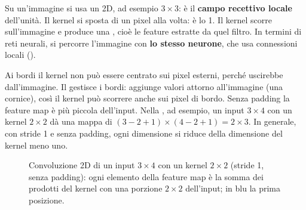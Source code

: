 Su un'immagine si usa un  2D, ad esempio $3\times3$: è il \textbf{campo recettivo locale}
dell'unità. Il kernel si sposta di un pixel alla volta: è lo  1. Il kernel scorre sull'immagine e
produce una , cioè le feature estratte da quel filtro. In termini di reti neurali, si percorre
l'immagine con \textbf{lo stesso neurone}, che usa connessioni locali ().

Ai bordi il kernel non può essere centrato sui pixel esterni, perché uscirebbe dall'immagine. Il
 gestisce i bordi: aggiunge valori attorno all'immagine (una cornice), così il kernel può
scorrere anche sui pixel di bordo. Senza padding la feature map è più piccola dell'input. Nella
, ad esempio, un input $3\times4$ con un kernel $2\times2$ dà una mappa di
$(3-2+1)\times(4-2+1) = 2\times3$. In generale, con stride 1 e senza padding, ogni dimensione si riduce della
dimensione del kernel meno uno.

\begin{figure}[ht]
\centering
{}
\caption{Convoluzione 2D di un input $3\times4$ con un kernel $2\times2$ (stride 1, senza padding): ogni elemento
della feature map è la somma dei prodotti del kernel con una porzione $2\times2$ dell'input; in blu la prima
posizione.}
\label{fig:conv2d}
\end{figure}

